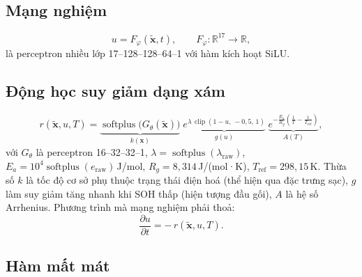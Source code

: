 \documentclass[12pt,a4paper,oneside]{report}
\theoremstyle{plain}
\theoremstyle{definition}
\newcommand{\R}{\mathbb{R}}
\begin{document}
\subsection{Mạng nghiệm}

\begin{equation}
u = F_\varphi(\tilde{\mathbf{x}}, t), \qquad F_\varphi:\R^{17} \to \R,
\end{equation}
là perceptron nhiều lớp 17--128--128--64--1 với hàm kích hoạt SiLU.

\subsection{Động học suy giảm dạng xám}

\begin{equation}\label{eq:rate}
r(\tilde{\mathbf{x}}, u, T) =
\underbrace{\operatorname{softplus}\big(G_\theta(\tilde{\mathbf{x}})\big)}_{k(\mathbf{x})}\;
\underbrace{e^{\lambda\,\operatorname{clip}(1-u,\,-0{,}5,\,1)}}_{g(u)}\;
\underbrace{e^{-\frac{E_a}{R_g}\left(\frac{1}{T}-\frac{1}{T_\text{ref}}\right)}}_{A(T)},
\end{equation}
với $G_\theta$ là perceptron 16--32--32--1, $\lambda = \operatorname{softplus}(\lambda_\text{raw})$,
$E_a = 10^4 \operatorname{softplus}(e_\text{raw})$\,J/mol, $R_g = 8{,}314$\,J/(mol·K), $T_\text{ref} = 298{,}15$\,K.
Thừa số $k$ là tốc độ cơ sở phụ thuộc trạng thái điện hoá (thể hiện qua đặc trưng sạc), $g$ làm suy giảm tăng
nhanh khi SOH thấp (hiện tượng đầu gối), $A$ là hệ số Arrhenius. Phương trình mà mạng nghiệm phải thoả:
\begin{equation}\label{eq:ode}
\frac{\partial u}{\partial t} = -\,r(\tilde{\mathbf{x}}, u, T).
\end{equation}

\subsection{Hàm mất mát}
\end{document}
